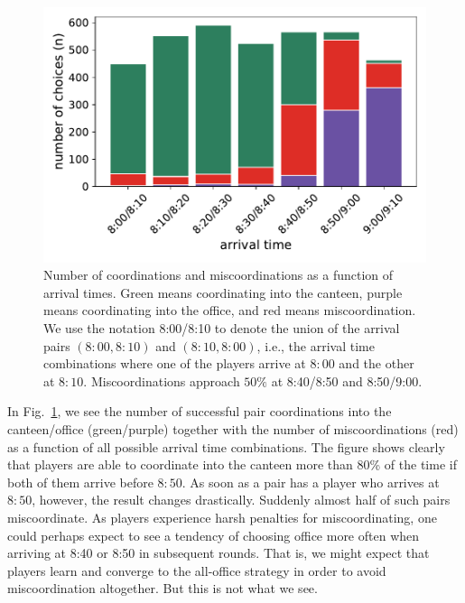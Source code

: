 \documentclass[twocolumn,a4paper,superscriptaddress,nofootinbib]{revtex4}
\begin{document}
\begin{figure} %
\centering\includegraphics[width=0.6\linewidth]{fig3_miscoordinations}
\caption{Number of coordinations and miscoordinations as a function of arrival times. Green means coordinating into the canteen, purple means coordinating into the office, and red means miscoordination. We use the notation 8:00/8:10 to denote the union of the arrival pairs $(8{:}00,8{:}10)$ and $(8{:}10,8{:}00)$, i.e., the arrival time combinations where one of the players arrive at $8{:}00$ and the other at $8{:}10$. Miscoordinations approach $50\%$ at 8:40/8:50 and 8:50/9:00.}
\label{fig:miscoordinations}
\end{figure}

In Fig.~\ref{fig:miscoordinations}, we see the number of successful pair coordinations into the canteen/office (green/purple) together with the number of miscoordinations (red) as a function of all possible arrival time combinations. The figure shows clearly that players are able to coordinate into the canteen more than 80\% of the time if both of them arrive before $8{:}50$. As soon as a pair has a player who arrives at $8{:}50$, however, the result changes drastically. Suddenly almost half of such pairs miscoordinate. As players experience harsh penalties for miscoordinating, one could perhaps expect to see a tendency of choosing office more often when arriving at 8:40 or 8:50 in subsequent rounds. That is, we might expect that players learn and converge to the all-office strategy in order to avoid miscoordination altogether. But this is not what we see.
\end{document}
